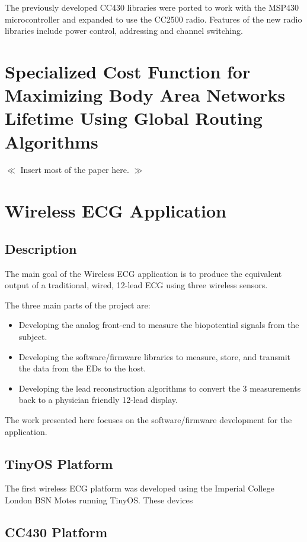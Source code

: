 \documentclass{article}
\begin{document}
The previously developed CC430 libraries were ported to work with the MSP430 microcontroller and expanded to use the CC2500 radio. Features of the new radio libraries include power control, addressing and channel switching.

\section{Specialized Cost Function for Maximizing Body Area Networks Lifetime Using Global Routing Algorithms}
$\ll$ Insert most of the paper here. $\gg$


\section{Wireless ECG Application}\label{section:wirelessecg}
\subsection{Description}
The main goal of the Wireless ECG application is to produce the equivalent output of a traditional, wired, 12-lead ECG using three wireless sensors. 

The three main parts of the project are: 
\begin{itemize}
\item Developing the analog front-end to measure the biopotential signals from the subject.
\item Developing the software/firmware libraries to measure, store, and transmit the data from the EDs to the host.
\item Developing the lead reconstruction algorithms to convert the 3 measurements back to a physician friendly 12-lead display.
\end{itemize}
The work presented here focuses on the software/firmware development for the application.


\subsection{TinyOS Platform}
The first wireless ECG platform was developed using the Imperial College London BSN Motes running TinyOS. These devices 


\subsection{CC430 Platform}
\end{document}
